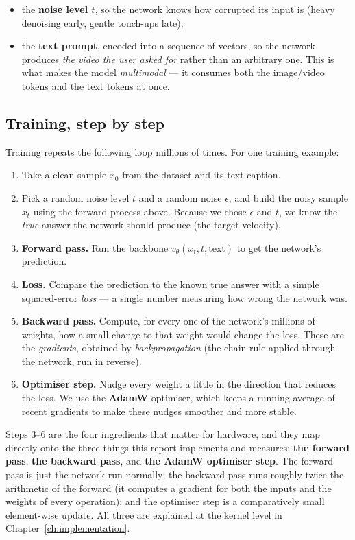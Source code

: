 \documentclass[11pt]{report}
\begin{document}
\begin{itemize}
\item the \textbf{noise level $t$}, so the network knows how corrupted its
input is (heavy denoising early, gentle touch-ups late);
\item the \textbf{text prompt}, encoded into a sequence of vectors, so the
network produces \emph{the video the user asked for} rather than an
arbitrary one. This is what makes the model \emph{multimodal} --- it
consumes both the image/video tokens and the text tokens at once.
\end{itemize}

\subsection{Training, step by step}
\label{sec:training-loop}

Training repeats the following loop millions of times. For one training
example:

\begin{enumerate}
\item Take a clean sample $x_0$ from the dataset and its text caption.
\item Pick a random noise level $t$ and a random noise $\epsilon$, and
build the noisy sample $x_t$ using the forward process above. Because we
chose $\epsilon$ and $t$, we know the \emph{true} answer the network
should produce (the target velocity).
\item \textbf{Forward pass.} Run the backbone $v_\theta(x_t, t, \text{text})$
to get the network's prediction.
\item \textbf{Loss.} Compare the prediction to the known true answer with a
simple squared-error \emph{loss} --- a single number measuring how wrong
the network was.
\item \textbf{Backward pass.} Compute, for every one of the network's
millions of weights, how a small change to that weight would change the
loss. These are the \emph{gradients}, obtained by \emph{backpropagation}
(the chain rule applied through the network, run in reverse).
\item \textbf{Optimiser step.} Nudge every weight a little in the
direction that reduces the loss. We use the \textbf{AdamW} optimiser,
which keeps a running average of recent gradients to make these nudges
smoother and more stable.
\end{enumerate}

Steps 3--6 are the four ingredients that matter for hardware, and they map
directly onto the three things this report implements and measures:
\textbf{the forward pass}, \textbf{the backward pass}, and \textbf{the
AdamW optimiser step}. The forward pass is just the network run normally;
the backward pass runs roughly twice the arithmetic of the forward (it
computes a gradient for both the inputs and the weights of every
operation); and the optimiser step is a comparatively small element-wise
update. All three are explained at the kernel level in
Chapter~\ref{ch:implementation}.
\end{document}
